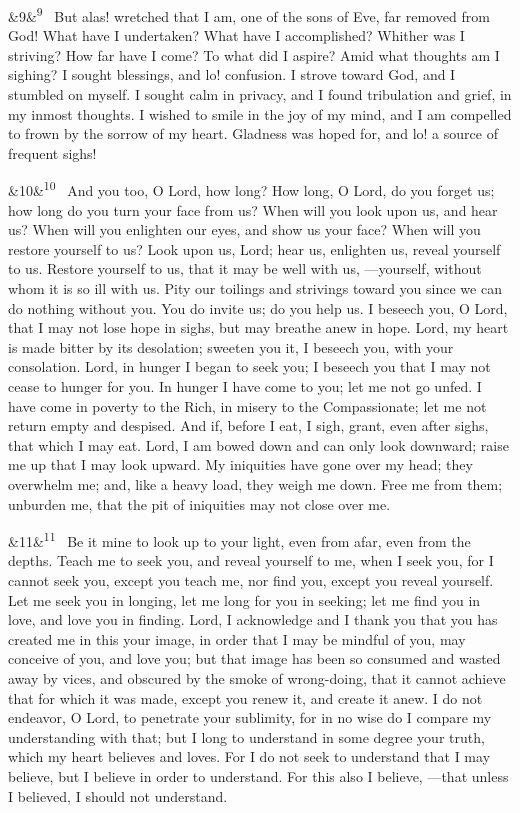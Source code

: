\documentclass[12pt]{article}
\newcommand{\para}[1][]{\par\noindent\ifx&#1&\else\textsuperscript{\footnotesize #1}~\fi}
\begin{document}
\para[9] But alas! wretched that I am, one of the sons of Eve, far removed from God! What have I undertaken? What have I accomplished? Whither was I striving? How far have I come? To what did I aspire? Amid what thoughts am I sighing? I sought blessings, and lo! confusion. I strove toward God, and I stumbled on myself. I sought calm in privacy, and I found tribulation and grief, in my inmost thoughts. I wished to smile in the joy of my mind, and I am compelled to frown by the sorrow of my heart. Gladness was hoped for, and lo! a source of frequent sighs!

\para[10] And you too, O Lord, how long? How long, O Lord, do you forget us; how long do you turn your face from us? When will you look upon us, and hear us? When will you enlighten our eyes, and show us your face? When will you restore yourself to us? Look upon us, Lord; hear us, enlighten us, reveal yourself to us. Restore yourself to us, that it may be well with us, ---yourself, without whom it is so ill with us. Pity our toilings and strivings toward you since we can do nothing without you. You do invite us; do you help us. I beseech you, O Lord, that I may not lose hope in sighs, but may breathe anew in hope. Lord, my heart is made bitter by its desolation; sweeten you it, I beseech you, with your consolation. Lord, in hunger I began to seek you; I beseech you that I may not cease to hunger for you. In hunger I have come to you; let me not go unfed. I have come in poverty to the Rich, in misery to the Compassionate; let me not return empty and despised. And if, before I eat, I sigh, grant, even after sighs, that which I may eat. Lord, I am bowed down and can only look downward; raise me up that I may look upward. My iniquities have gone over my head; they overwhelm me; and, like a heavy load, they weigh me down. Free me from them; unburden me, that the pit of iniquities may not close over me.

\para[11] Be it mine to look up to your light, even from afar, even from the depths. Teach me to seek you, and reveal yourself to me, when I seek you, for I cannot seek you, except you teach me, nor find you, except you reveal yourself. Let me seek you in longing, let me long for you in seeking; let me find you in love, and love you in finding. Lord, I acknowledge and I thank you that you has created me in this your image, in order that I may be mindful of you, may conceive of you, and love you; but that image has been so consumed and wasted away by vices, and obscured by the smoke of wrong-doing, that it cannot achieve that for which it was made, except you renew it, and create it anew. I do not endeavor, O Lord, to penetrate your sublimity, for in no wise do I compare my understanding with that; but I long to understand in some degree your truth, which my heart believes and loves. For I do not seek to understand that I may believe, but I believe in order to understand. For this also I believe, ---that unless I believed, I should not understand.
\end{document}
